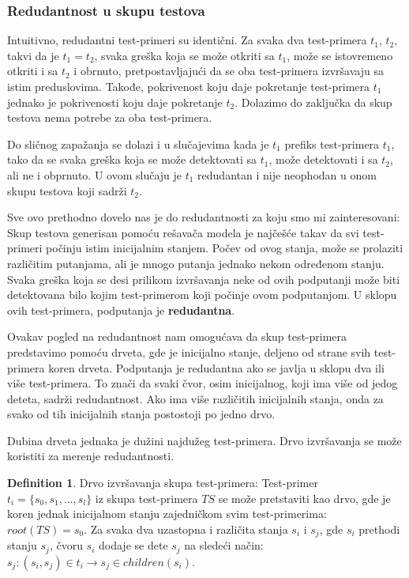 \documentclass[a4paper]{article}
\theoremstyle{definition}
\newtheorem{definition}{Definition}[section]
\begin{document}
\subsubsection{Redudantnost u skupu testova}
\label{subsubsec:redudantnost}

Intuitivno, redudantni test-primeri su identični. Za svaka dva test-primera $t_1$, $t_2$, takvi da je $ t_1 = t_2$, svaka greška koja se može otkriti sa $t_1$, može se istovremeno otkriti i sa $t_2$ i obrnuto, pretpostavljajući da se oba test-primera izvršavaju sa istim preduslovima. Takođe, pokrivenost koju daje pokretanje test-primera $t_1$ jednako je pokrivenosti koju daje pokretanje $t_2$. Dolazimo do zaključka da skup testova nema potrebe za oba test-primera.

Do sličnog zapažanja se dolazi i u slučajevima kada je $t_1$ prefiks test-primera $t_1$, tako da se svaka greška koja se može detektovati sa $t_1$, može detektovati i sa $t_2$, ali ne i obprnuto. U ovom slučaju je $t_1$ redudantan i nije neophodan u onom skupu testova koji sadrži $t_2$.

Sve ovo prethodno dovelo nas je do redudantnosti za koju smo mi zainteresovani: Skup testova generisan pomoću rešavača modela je najčešće takav da svi test-primeri počinju istim inicijalnim stanjem. Počev od ovog stanja, može se prolaziti različitim putanjama, ali je mnogo putanja jednako nekom određenom stanju. Svaka greška koja se desi prilikom izvršavanja neke od ovih podputanji može biti detektovana bilo kojim test-primerom koji počinje ovom podputanjom. U sklopu ovih test-primera, podputanja je \textbf{redudantna}.

Ovakav pogled na redudantnost nam omogućava da skup test-primera predstavimo pomoću drveta, gde je inicijalno stanje, deljeno od strane svih test-primera koren drveta. Podputanja je redudantna ako se javlja u sklopu dva ili više test-primera. To znači da svaki čvor, osim inicijalnog, koji ima više od jedog deteta, sadrži redudantnost. Ako ima više različitih inicijalnih stanja, onda za svako od tih inicijalnih stanja postostoji po jedno drvo.

Dubina drveta jednaka je dužini najdužeg test-primera. Drvo izvršavanja se može koristiti za merenje redudantnosti.

\begin{definition}{Drvo izvršavanja skupa test-primera:}
Test-primer $t_i = \{s_0, s_1, ..., s_l\}$ iz skupa test-primera $TS$ se može pretstaviti kao drvo, gde je koren jednak inicijalnom stanju zajedničkom svim test-primerima: $root(TS) = s_0$. Za svaka dva uzastopna i različita stanja $s_i$ i $s_j$, gde $s_i$ prethodi stanju $s_j$, čvoru $s_i$ dodaje se dete $s_j$ na sledeći način: $s_j: (s_i, s_j) \in t_i \rightarrow s_j \in children(s_i)$.
\end{definition}
\end{document}
